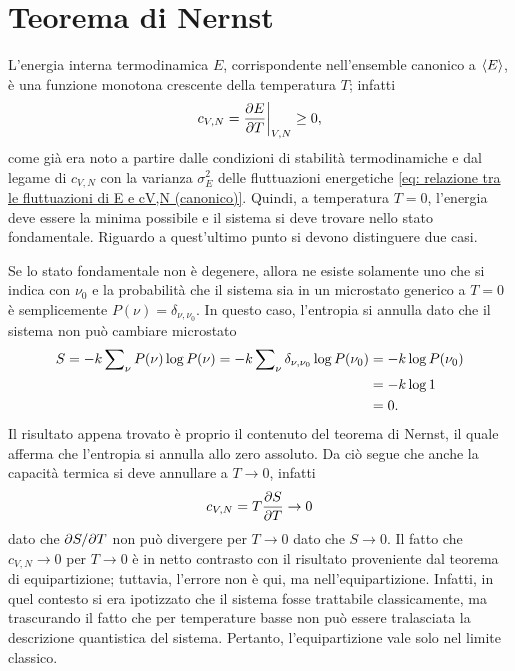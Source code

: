 \section{Teorema di Nernst}
L'energia interna termodinamica $E$, corrispondente nell'ensemble canonico a $\langle E \rangle$, è una funzione monotona crescente della temperatura $T$; infatti
\begin{equation}
    c_{V,N} = \frac{\partial E}{\partial T}\bigg|_{V,N} \ge 0,
\end{equation}
come già era noto a partire dalle condizioni di stabilità termodinamiche e dal legame di $c_{V,N}$ con la varianza $\sigma_E^2$ delle fluttuazioni energetiche \eqref{eq: relazione tra le fluttuazioni di E e cV,N (canonico)}. Quindi, a temperatura $T = 0$, l'energia deve essere la minima possibile e il sistema si deve trovare nello stato fondamentale. Riguardo a quest'ultimo punto si devono distinguere due casi.
\setcounter{caso}{0}
\begin{caso}
    Se lo stato fondamentale non è degenere, allora ne esiste solamente uno che si indica con $\nu_0$ e la probabilità che il sistema sia in un microstato generico a $T=0$ è semplicemente $P(\nu) = \delta_{\nu,\nu_0}$. In questo caso, l'entropia si annulla dato che il sistema non può cambiare microstato
    \begin{equation}
        \begin{split}
            S = -k\sum\nolimits_\nu P(\nu)\log{P(\nu)} = -k\sum\nolimits_\nu\delta_{\nu,\nu_0}\log{P(\nu_0)} &= -k\log{P(\nu_0)} \\
            &= -k\log{1} \\
            &= 0.
        \end{split}
    \end{equation}
    Il risultato appena trovato è proprio il contenuto del teorema di Nernst, il quale afferma che l'entropia si annulla allo zero assoluto. Da ciò segue che anche la capacità termica si deve annullare a $T \to 0$, infatti
    \begin{equation}
        c_{V,N} = T\frac{\partial S}{\partial T} \to 0
    \end{equation}
    dato che $\partial S/\partial T$ non può divergere per $T \to 0$ dato che $S \to 0$. Il fatto che $c_{V,N} \to 0$ per $T \to 0$ è in netto contrasto con il risultato proveniente dal teorema di equipartizione; tuttavia, l'errore non è qui, ma nell'equipartizione. Infatti, in quel contesto si era ipotizzato che il sistema fosse trattabile classicamente, ma trascurando il fatto che per temperature basse non può essere tralasciata la descrizione quantistica del sistema. Pertanto, l'equipartizione vale solo nel limite classico.
\end{caso}
